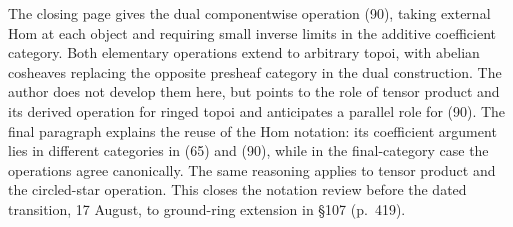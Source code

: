 The closing page gives the dual componentwise operation (90), taking external Hom at each object and requiring small inverse limits in the additive coefficient category. Both elementary operations extend to arbitrary topoi, with abelian cosheaves replacing the opposite presheaf category in the dual construction. The author does not develop them here, but points to the role of tensor product and its derived operation for ringed topoi and anticipates a parallel role for (90). The final paragraph explains the reuse of the Hom notation: its coefficient argument lies in different categories in (65) and (90), while in the final-category case the operations agree canonically. The same reasoning applies to tensor product and the circled-star operation. This closes the notation review before the dated transition, 17 August, to ground-ring extension in \S107 (p.\ 419).
